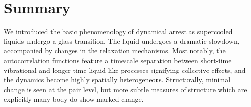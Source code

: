 \documentclass[11pt,twoside]{report}
\begin{document}


\section{Summary}

We introduced the basic phenomenology of dynamical arrest as supercooled liquids undergo a glass transition.
The liquid undergoes a dramatic slowdown, accompanied by changes in the relaxation mechanisms.
Most notably, the autocorrelation functions feature a timescale separation between short-time vibrational and longer-time liquid-like processes signifying collective effects, and the dynamics become highly spatially heterogeneous.
Structurally, minimal change is seen at the pair level, but more subtle measures of structure which are explicitly many-body do show marked change.
\end{document}
